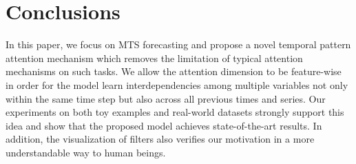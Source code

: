\section{Conclusions}\label{sec:conclusions}
In this paper, we focus on MTS forecasting and propose a novel temporal pattern attention mechanism which removes the limitation of typical attention mechanisms on such tasks.
We allow the attention dimension to be feature-wise in order for the model learn interdependencies among multiple variables not only within the same time step but also across all previous times and series.
Our experiments on both toy examples and real-world datasets strongly support this idea and show that the proposed model achieves state-of-the-art results.
In addition, the visualization of filters also verifies our motivation in a more understandable way to human beings.



         




